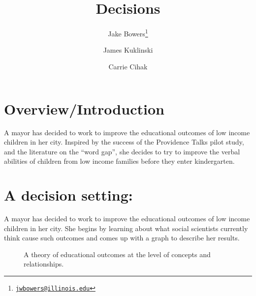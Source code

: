 \documentclass[
]{article}
\title{Decisions}
\author{Jake Bowers\footnote{\href{mailto:jwbowers@illinois.edu}{\nolinkurl{jwbowers@illinois.edu}}} \and James
Kuklinski \and Carrie Cihak}
\date{}
\begin{document}
\maketitle

\hypertarget{overviewintroduction}{%
\section{Overview/Introduction}\label{overviewintroduction}}

A mayor has decided to work to improve the educational outcomes of low
income children in her city. Inspired by the success of the Providence
Talks pilot study, and the literature on the ``word gap'', she decides
to try to improve the verbal abilities of children from low income
families before they enter kindergarten.


\hypertarget{a-decision-setting}{%
\section{A decision setting:}\label{a-decision-setting}}

A mayor has decided to work to improve the educational outcomes of low
income children in her city. She begins by learning about what social
scientists currently think cause such outcomes and comes up with a graph
to describe her results.

\begin{figure}[!h]
\centering
{}
\caption{A theory of educational outcomes at the level of concepts and
relationships.}\label{fig:theory1}
\end{figure}
\end{document}
